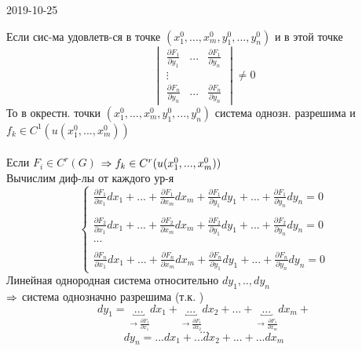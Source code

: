 \documentclass[12pt, fleqn]{article}
\begin{document}
\begin{lect}{2019-10-25}
    \begin{theorem}
        Если сис-ма удовлетв-ся в точке $(x_1^0, ..., x_m^0, y_1^0, ..., y_n^0)$ и в этой 
        точке 
        \[\begin{vmatrix}
            \frac{\partial F_1}{\partial y_1} & ... & \frac{\partial F_1}{\partial y_n}\\
            \vdots\\
            \frac{\partial F_n}{\partial y_n} & ... & \frac{\partial F_n}{\partial y_n}
        \end{vmatrix} \neq 0\]
        То в окрестн. точки $(x_1^0, ..., x_m^0, y_1^0, ..., y_n^0)$ система однозн. 
        разрешима и $f_k \in C^1(u(x_1^0, ..., x^0_m)) $\\
        \\
        Если $F_i \in C^r(G)$ \qq $\Rightarrow f_k \in C^r(u(x_1^0, ..., x_m^0))$\\
        Вычислим диф-лы от каждого ур-я
        \[\begin{cases} \displaystyle 
            \frac{\partial F_1}{\partial x_1} dx_1 + ... + \frac{\partial F_1}{
            \partial x_m}dx_m + \frac{\partial F_1}{\partial y_1}dy_1 + ... +
            \frac{\partial F_1}{\partial y_n}dy_n = 0\\\\ \displaystyle 
            \frac{\partial F_2}{\partial x_1} dx_1 + ... + \frac{\partial F_2}{
            \partial x_m}dx_m + \frac{\partial F_2}{\partial y_1}dy_1 + ... +
            \frac{\partial F_2}{\partial y_n}dy_n = 0\\
            ...\\\\\displaystyle 
            \frac{\partial F_n}{\partial x_1} dx_1 + ... + \frac{\partial F_n}{
            \partial x_m}dx_m + \frac{\partial F_n}{\partial y_1}dy_1 + ... +
            \frac{\partial F_n}{\partial y_n}dy_n = 0
        \end{cases}\]
        Линейная однородная система относительно $dy_1, .., dy_n$\\
        $\Rightarrow$ система однозначно разрешима (т.к. )
        \[dy_1 = \underbracket{...}_{\to \frac{\partial F_1}{\partial x_1}} dx_1 + 
            \underbracket{...}_{\to \frac{\partial F_1}{\partial x_2}} dx_2 + 
            ... +
            \underbracket{...}_{\to \frac{\partial F_1}{\partial x_m}} dx_m + 
        \]
        \[...\]
        \[dy_n = ... dx_1 + ... dx_2 + ... + ... dx_m\]
    \end{theorem}


\end{lect}
\end{document}
